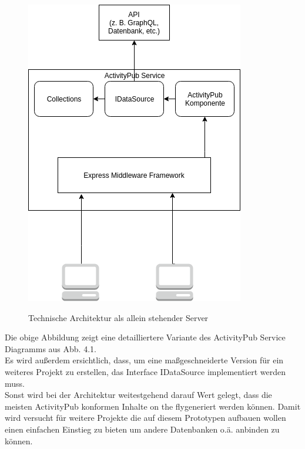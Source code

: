 	\begin{figure}[h]
		\begin{minipage}{\textwidth}
			\centering
			\includegraphics[scale=0.6]{figures/Technische-Architektur-standalone.png}
			\label{technische-architektur-standalone}
			\caption{Technische Architektur als allein stehender Server}
		\end{minipage}
	\end{figure}

	Die obige Abbildung zeigt eine detailliertere Variante des ActivityPub Service Diagramms aus Abb. 4.1.\\
	Es wird außerdem ersichtlich, dass, um eine maßgeschneiderte Version für ein weiteres Projekt zu erstellen, das Interface IDataSource implementiert werden muss.\\ 
	Sonst wird bei der Architektur weitestgehend darauf Wert gelegt, dass die meisten ActivityPub konformen Inhalte \glqq on the fly\grqq generiert werden können. Damit wird versucht für weitere Projekte die auf diesem Prototypen aufbauen wollen einen einfachen Einstieg zu bieten um andere Datenbanken o.ä. anbinden zu können.